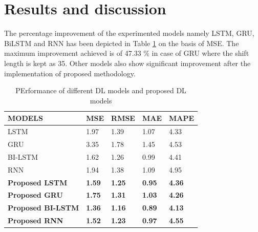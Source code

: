 \documentclass[sn-mathphys,Numbered]{sn-jnl}
\theoremstyle{thmstyleone}
\theoremstyle{thmstyletwo}
\theoremstyle{thmstylethree}
\begin{document}
\section{Results and discussion}\label{sec2}
The percentage improvement  of the experimented models namely LSTM, GRU, BiLSTM and RNN has been depicted in Table \ref{tab:MSE} on the basis of MSE. The maximum improvement achieved is of 47.33 \% in case of GRU where the shift length is kept as 35. Other models also show significant improvement after the implementation of proposed methodology.

\begin{table}[ht!]
\centering
\caption{PErformance of different DL models and proposed DL models}
\label{tab:MSE}
\begin{tabular}{lllll}
\hline
\textbf{MODELS} & \textbf{MSE} & \textbf{RMSE} & \textbf{MAE} & \textbf{MAPE}  \\ \hline
  LSTM    & 1.97   & 1.39 & 1.07 & 4.33 \\
  GRU    & 3.35 & 1.78 & 1.45 & 4.53 \\
  BI-LSTM & 1.62   & 1.26 & 0.99 & 4.41 \\
  RNN     & 1.94   & 1.38 & 1.09 & 4.95 \\
\textbf{Proposed LSTM}    & \textbf{1.59}   & \textbf{1.25} & \textbf{0.95} & \textbf{4.36} \\
\textbf{Proposed GRU}     & \textbf{1.75} & \textbf{1.31} & \textbf{1.03} & \textbf{4.26} \\
\textbf{Proposed BI-LSTM} & \textbf{1.36}   & \textbf{1.16} & \textbf{0.89} & \textbf{4.13} \\
\textbf{Proposed RNN}     & \textbf{1.52}   & \textbf{1.23} & \textbf{0.97} & \textbf{4.55} \\ \hline
\end{tabular}
\end{table}
\end{document}
